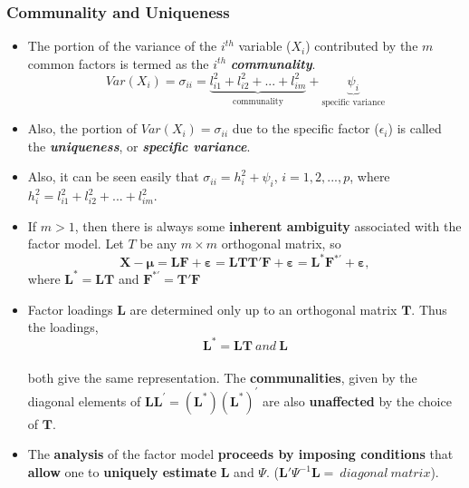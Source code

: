 \documentclass[10pt]{beamer} %
\begin{document}
\begin{frame}
   \frametitle{Communality and Uniqueness}
   \begin{itemize}
      \item The portion of the variance of the $i^{th}$ variable ($X_i$)
         contributed by the $m$ common factors is termed as the $i^{th}$
         \textit{\textbf{communality}}.
         $$Var(X_i)= \sigma_{ii} =
         \underbrace{l_{i1}^2+l_{i2}^2+...+l_{im}^2}_{\text{communality}} +
         \underbrace{\psi_{i}}_{\text{specific variance}}$$
      \item Also, the portion of $Var(X_i)=\sigma_{ii}$ due to the specific
         factor ($\epsilon_i$) is called the \textit{\textbf{uniqueness}}, or
         \textit{\textbf{specific variance}}.
         \vspace{0.45cm}
      \item Also, it can be seen easily that $\sigma_{ii} = h_i^2+\psi_i$,
         $i=1,2,...,p$, where $h_i^2 = l_{i1}^2+l_{i2}^2+...+l_{im}^2$.
   \end{itemize}
\end{frame}

\begin{frame}

   \begin{itemize}
      \item If $m >1$, then there is always some \textbf{inherent ambiguity} associated with the factor model. Let $T$ be any $m \times m$ orthogonal matrix, so
         $$\mathbf{X}-\boldsymbol{\mu} = \mathbf{L}\mathbf{F}+\mathbf{\boldsymbol{\varepsilon}} = \mathbf{L}\mathbf{T}\mathbf{T'}\mathbf{F}+\mathbf{\boldsymbol{\varepsilon}} = \mathbf{L^*}\mathbf{F^{*'}}+\mathbf{\boldsymbol{\varepsilon}}, $$
         where $\mathbf{L^*} = \mathbf{L}\mathbf{T}$ and $\mathbf{F^{*'}} = \mathbf{T'}\mathbf{F} $
         \vspace{0.25cm}
      \item Factor loadings $\mathbf{L}$ are determined only up to an orthogonal matrix $\mathbf{T}$. Thus the loadings, \begin{equation*}
            \mathbf{L}^{*} = \mathbf{L}\mathbf{T}\ and\ \mathbf{L} 
         \end{equation*} \\  both give the same representation. The \textbf{communalities}, given by the diagonal elements of $\mathbf{L}\mathbf{L}^{'} = (\mathbf{L}^{*})(\mathbf{L}^{*})^{'}$ are also \textbf{unaffected} by the choice of $\mathbf{T}$.
         \vspace{0.25cm}
      \item The \textbf{analysis} of the factor model \textbf{proceeds by imposing conditions} that \textbf{allow} one to \textbf{uniquely estimate} $\mathbf{L}$ and $\Psi$. ($\mathbf{L}'\Psi^{-1}\mathbf{L} = \ diagonal \ matrix$).
   \end{itemize}
\end{frame}
\end{document}
